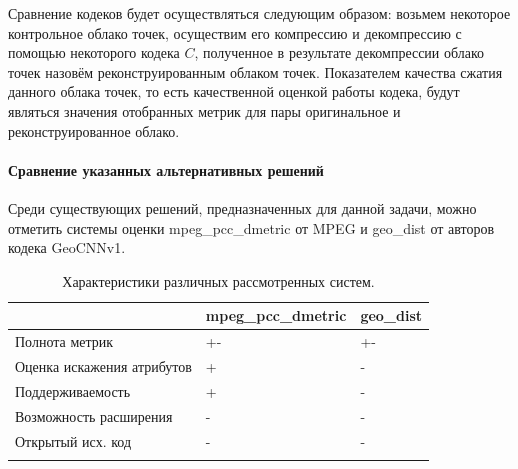 \documentclass[a4paper,12pt]{extreport}
\begin{document}
Сравнение кодеков будет осуществляться следующим образом: возьмем некоторое
контрольное облако точек, осуществим его компрессию и декомпрессию с помощью
некоторого кодека $C$, полученное в результате декомпрессии облако точек назовём
реконструированным облаком точек. Показателем качества сжатия данного облака
точек, то есть качественной оценкой работы кодека, будут являться значения
отобранных метрик для пары оригинальное и реконструированное облако.







\paragraph{Сравнение указанных альтернативных решений}

Среди существующих решений, предназначенных для данной задачи, можно отметить
системы оценки mpeg\_pcc\_dmetric от MPEG и geo\_dist от авторов кодека
GeoCNNv1.

\begin{xltabular}{\linewidth}{|l|X|X|}
    \hline
    & mpeg\_pcc\_dmetric & geo\_dist \\
    \hline
    Полнота метрик & +- & +- \\
    \hline
    Оценка искажения атрибутов & + & - \\
    \hline
    Поддерживаемость & + & - \\
    \hline
    Возможность расширения & - & - \\
    \hline
    Открытый исх. код & - & - \\
    \hline
    \caption{
        Характеристики различных рассмотренных систем.
        \label{tab:systems_comparison}
    } \\
\end{xltabular}
\end{document}
